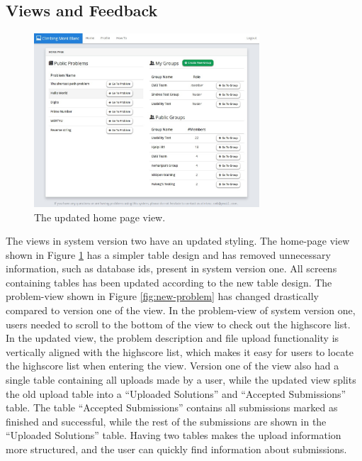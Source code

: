 \subsection{Views and Feedback}
\label{sub-sec:impr-views-feedback}
\begin{figure}[b!]
    \centering
    \includegraphics[width=0.75\textwidth]{figs/new_homepage.jpg}
    \caption[The updated home page view]{The updated home page view.}
    \label{fig:new-homepage}
\end{figure}
The views in system version two have an updated styling. The home-page view shown in Figure \ref{fig:new-homepage} has a simpler table design and has removed unnecessary information, such as database ids, present in system version one. All screens containing tables has been updated according to the new table design. The problem-view shown in Figure \ref{fig:new-problem} has changed drastically compared to version one of the view. In the problem-view of system version one, users needed to scroll to the bottom of the view to check out the highscore list. In the updated view, the problem description and file upload functionality is vertically aligned with the highscore list, which makes it easy for users to locate the highscore list when entering the view. Version one of the view also had a single table containing all uploads made by a user, while the updated view splits the old upload table into a “Uploaded Solutions” and “Accepted Submissions” table. The table “Accepted Submissions” contains all submissions marked as finished and successful, while the rest of the submissions are shown in the “Uploaded Solutions” table. Having two tables makes the upload information more structured, and the user can quickly find information about submissions. \\

